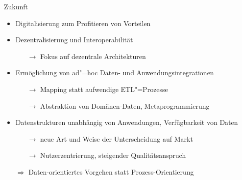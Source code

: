 \begin{frame}{Zukunft}


    \begin{itemize}
        \item Digitalisierung zum Profitieren von Vorteilen

        \pause
        \item Dezentralisierung und Interoperabilität
        \begin{itemize}
            \item[$\to$] Fokus auf dezentrale Architekturen
        \end{itemize}

        \pause
        \item Ermöglichung von ad"=hoc Daten- und Anwendungsintegrationen
        \begin{itemize}
            \item[$\to$] Mapping statt aufwendige ETL"=Prozesse
            
            \item[$\to$] Abstraktion von Domänen-Daten, Metaprogrammierung
        \end{itemize}

        \pause
        \item Datenstrukturen unabhängig von Anwendungen, Verfügbarkeit von Daten
        \begin{itemize}
            \item[$\to$] neue Art und Weise der Unterscheidung auf Markt
            \item[$\to$] Nutzerzentrierung, steigender Qualitätsanspruch
        \end{itemize}

        \pause
        \item[$\Rightarrow$] Daten-orientiertes Vorgehen statt Prozess-Orientierung
    \end{itemize}
\end{frame}
